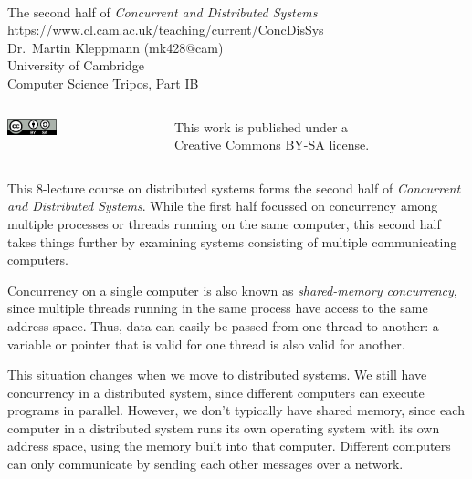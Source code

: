 \begin{frame}
    \label{s:title}
    \begin{center}
        \textbf{\huge{\color{darkblue}{Distributed Systems}}} \\[2em]
        The second half of \emph{Concurrent and Distributed Systems}\\[0.5em]
        \url{https://www.cl.cam.ac.uk/teaching/current/ConcDisSys}\\[2em]
        Dr.\ Martin Kleppmann (mk428@cam) \\[0.5em]
        University of Cambridge \\[0.5em]
        Computer Science Tripos, Part IB \\[2em]
    \end{center}
    \begin{columns}[totalwidth=9cm]
        \begin{column}{4cm}
            \hfill\includegraphics[height=0.5cm]{images/creative-commons.png}\hspace{5pt}
        \end{column}
        \begin{column}{5cm}\scriptsize
            This work is published under a\\\href{https://creativecommons.org/licenses/by-sa/4.0/}{Creative Commons BY-SA license}.
        \end{column}
    \end{columns}
\end{frame}

This 8-lecture course on distributed systems forms the second half of \emph{Concurrent and Distributed Systems}.
While the first half focussed on concurrency among multiple processes or threads running on the same computer, this second half takes things further by examining systems consisting of multiple communicating computers.

Concurrency on a single computer is also known as \emph{shared-memory concurrency}, since multiple threads running in the same process have access to the same address space.
Thus, data can easily be passed from one thread to another: a variable or pointer that is valid for one thread is also valid for another.

This situation changes when we move to distributed systems.
We still have concurrency in a distributed system, since different computers can execute programs in parallel.
However, we don't typically have shared memory, since each computer in a distributed system runs its own operating system with its own address space, using the memory built into that computer.
Different computers can only communicate by sending each other messages over a network.

